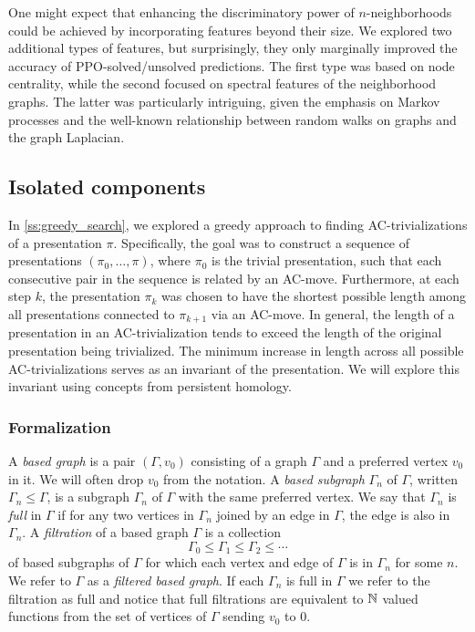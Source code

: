\medskip

One might expect that enhancing the discriminatory power of \(n\)-neighborhoods could be achieved by incorporating features beyond their size.
We explored two additional types of features, but surprisingly, they only marginally improved the accuracy of PPO-solved/unsolved predictions.
The first type was based on node centrality, while the second focused on spectral features of the neighborhood graphs.
The latter was particularly intriguing, given the emphasis on Markov processes and the well-known relationship between random walks on graphs and the graph Laplacian.


\subsection{Isolated components}

In \cref{ss:greedy_search}, we explored a greedy approach to finding AC-trivializations of a presentation \(\pi\).
Specifically, the goal was to construct a sequence of presentations \((\pi_0, \dots, \pi)\), where \(\pi_0\) is the trivial presentation, such that each consecutive pair in the sequence is related by an AC-move.
Furthermore, at each step \(k\), the presentation \(\pi_k\) was chosen to have the shortest possible length among all presentations connected to \(\pi_{k+1}\) via an AC-move.
In general, the length of a presentation in an AC-trivialization tends to exceed the length of the original presentation being trivialized.
The minimum increase in length across all possible AC-trivializations serves as an invariant of the presentation.
We will explore this invariant using concepts from persistent homology.

\subsubsection{Formalization}

A \textit{based graph} is a pair $(\Gamma, v_0)$ consisting of a graph $\Gamma$ and a preferred vertex $v_0$ in it.
We will often drop $v_0$ from the notation.
A \textit{based subgraph} $\Gamma_n$ of $\Gamma$, written $\Gamma_n \leq \Gamma$, is a subgraph $\Gamma_n$ of $\Gamma$ with the same preferred vertex.
We say that $\Gamma_n$ is \textit{full} in $\Gamma$ if for any two vertices in $\Gamma_n$ joined by an edge in $\Gamma$, the edge is also in $\Gamma_n$.
A \textit{filtration} of a based graph $\Gamma$ is a collection
\[
\Gamma_0 \leq \Gamma_1 \leq \Gamma_2 \leq \dotsb
\]
of based subgraphs of $\Gamma$ for which each vertex and edge of $\Gamma$ is in $\Gamma_n$ for some $n$.
We refer to $\Gamma$ as a \textit{filtered based graph}.
If each $\Gamma_n$ is full in $\Gamma$ we refer to the filtration as full and notice that full filtrations are equivalent to $\mathbb{N}$ valued functions from the set of vertices of $\Gamma$ sending $v_0$ to $0$.

